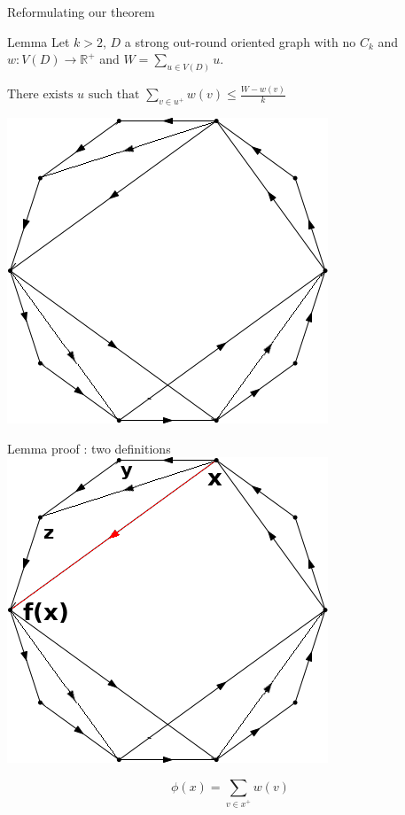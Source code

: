 \documentclass{beamer}
\begin{document}
\begin{frame}{Reformulating our theorem}
\begin{block}{Lemma}
Let $k>2$, $D$ a strong out-round oriented graph with no $C_k$ and $w : V(D) \rightarrow \mathbb{R}^{+}$ and $W = \sum_{u \in V(D)} u$.

$\text{There exists }u\text{ such that }\sum_{v\in u^+} w(v) \leq \frac{W-w(v)}{k}$
\end{block}

\centering

\includegraphics[scale=0.5]{Images/inround_reversed.png}

\end{frame}

\begin{frame}{Lemma proof : two definitions}
\centering
\includegraphics[scale=0.7]{Images/inround_reversed_def.png}

\pause

$$\phi(x) = \sum_{v \in x^+} w(v)$$
\end{frame}
\end{document}
